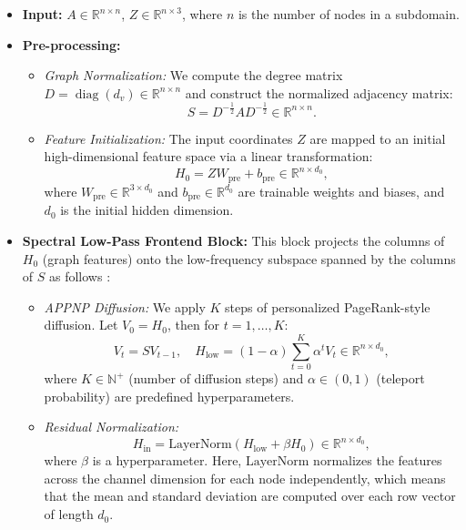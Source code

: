 \documentclass{article}
\DeclareMathOperator{\Diag}{diag}
\theoremstyle{definition}
\theoremstyle{remark}
\begin{document}
\begin{itemize}
    \item \textbf{Input:} $A \in \mathbb{R} ^ {n \times n}$, $Z \in \mathbb{R} ^ {n \times 3}$, where $n$ is the number of nodes in a subdomain.
    
    \item \textbf{Pre-processing:} 
    \begin{itemize}
        \item \textit{Graph Normalization:} We compute the degree matrix \(D = \Diag({d_v}) \in \mathbb{R}^{n \times n}\) and construct the normalized adjacency matrix:
        \[
            S = D^{-\frac{1}{2}} A D^{-\frac{1}{2}} \in \mathbb{R}^{n \times n}.
        \]
        \item \textit{Feature Initialization:} The input coordinates $Z$ are mapped to an initial high-dimensional feature space via a linear transformation:
        \[
            H_0 = Z W_{\mathrm{pre}} + b_{\mathrm{pre}} \in \mathbb{R}^{n \times d_0},
        \]
        where \(W_{\mathrm{pre}} \in \mathbb{R}^{3 \times d_0}\) and \(b_{\mathrm{pre}} \in \mathbb{R}^{d_0}\) are trainable weights and biases, and \(d_0\) is the initial hidden dimension.
    \end{itemize}
    
    \item \textbf{Spectral Low-Pass Frontend Block:}
    This block projects the columns of \(H_0\) (graph features) onto the low-frequency subspace spanned by the columns of \(S\) as follows \cite{gasteiger2018predict}:
    \begin{itemize}
        \item \textit{APPNP Diffusion:} We apply \(K\) steps of personalized PageRank-style diffusion. Let \(V_0 = H_0\), then for \(t=1, \dots, K\):
        \[
            V_t = S V_{t-1}, \quad H_{\mathrm{low}} = (1-\alpha) \sum_{t=0}^{K} \alpha^t V_t \in \mathbb{R}^{n \times d_0},
        \]
        where \(K \in \mathbb{N}^+\) (number of diffusion steps) and \(\alpha \in (0,1)\) (teleport probability) are predefined hyperparameters.
        \item \textit{Residual Normalization:} 
        \[
            H_{\mathrm{in}} = \mathrm{LayerNorm}\!\left(H_{\mathrm{low}} + \beta H_0\right) \in \mathbb{R}^{n \times d_0},
        \]
        where \(\beta\) is a hyperparameter. Here, \(\mathrm{LayerNorm}\) normalizes the features across the channel dimension for each node independently, which means that the mean and standard deviation are computed over each row vector of length \(d_0\).
    \end{itemize}


\end{itemize}
\end{document}

